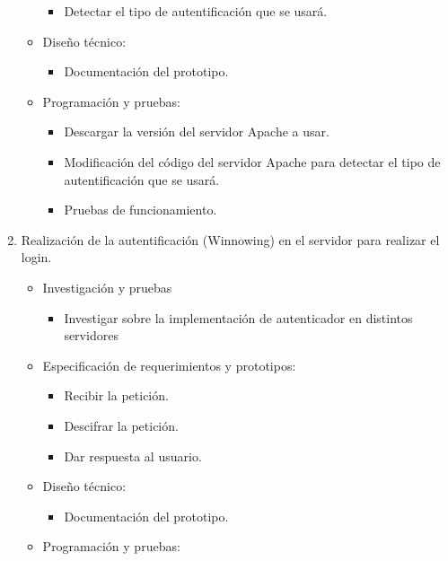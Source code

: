 \documentclass[12pt, a4paper, titlepage]{report}
\begin{document}
\begin{enumerate}
\begin{itemize}
\begin{itemize}
                    \item  Detectar el tipo de autentificación que se usará.
                \end{itemize}
                \item Diseño técnico: 
                \begin{itemize}
                    \item Documentación del prototipo.
                \end{itemize}
                \item Programación y pruebas:
                \begin{itemize}
                    \item Descargar la versión del servidor Apache a usar.
                    \item Modificación del código del servidor Apache para detectar el tipo de autentificación que se usará. 
                    \item Pruebas de funcionamiento.
                \end{itemize}
            \end{itemize}
            \item Realización de la autentificación (Winnowing) en el servidor para realizar el login.
            \begin{itemize}
                \item Investigación y pruebas
                \begin{itemize}
                    \item  Investigar sobre la implementación de autenticador en distintos servidores 
                \end{itemize}
                \item Especificación de requerimientos y prototipos:
                \begin{itemize}
                    \item Recibir la petición.
                    \item Descifrar la petición.
                    \item Dar respuesta al usuario.
                \end{itemize}
                \item Diseño técnico:
                \begin{itemize}
                    \item Documentación del prototipo. 
                \end{itemize}
                \item Programación y pruebas:

\end{itemize}
\end{enumerate}
\end{document}
